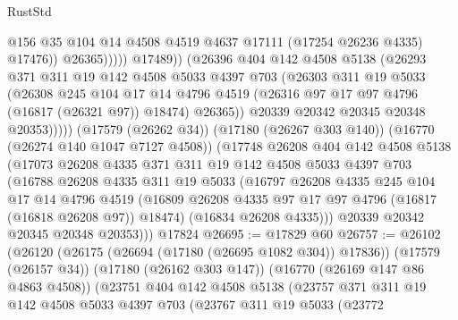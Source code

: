 \begin{lexlean}{RustStd}
\begin{coremodule}
{\begin{coremodule}
{{{{{{{{{{{{{{{{{{{{{{{{{{{{{{{{{{{{{{{{{{{{{{{{{{{{{{{                              @156
                              @35
                              @104
                              @14
                              @4508
                              @4519
                              @4637
                              @17111
                              (@17254 @26236 @4335)
                              @17476))
                          @26365)))))
                @17489))
            (@26396
              @404
              @142
              @4508
              @5138
              (@26293
                @371
                @311
                @19
                @142
                @4508
                @5033
                @4397
                @703
                (@26303
                  @311
                  @19
                  @5033
                  (@26308
                    @245
                    @104
                    @17
                    @14
                    @4796
                    @4519
                    (@26316 @97 @17 @97 @4796 (@16817 (@26321 @97)) @18474)
                    @26365))
                @20339
                @20342
                @20345
                @20348
                @20353)))))
      (@17579 (@26262 @34))
      (@17180 (@26267 @303 @140))
      (@16770 (@26274 @140 @1047 @7127 @4508))
      (@17748
        @26208
        @404
        @142
        @4508
        @5138
        (@17073
          @26208
          @4335
          @371
          @311
          @19
          @142
          @4508
          @5033
          @4397
          @703
          (@16788
            @26208
            @4335
            @311
            @19
            @5033
            (@16797
              @26208
              @4335
              @245
              @104
              @17
              @14
              @4796
              @4519
              (@16809 @26208 @4335 @97 @17 @97 @4796 (@16817 (@16818 @26208 @97)) @18474)
              (@16834 @26208 @4335)))
          @20339
          @20342
          @20345
          @20348
          @20353)))
    @17824
@26695 := @17829 @60
@26757 := @26102
    (@26120
      (@26175 (@26694 (@17180 (@26695 @1082 @304)) @17836))
      (@17579 (@26157 @34))
      (@17180 (@26162 @303 @147))
      (@16770 (@26169 @147 @86 @4863 @4508))
      (@23751
        @404
        @142
        @4508
        @5138
        (@23757
          @371
          @311
          @19
          @142
          @4508
          @5033
          @4397
          @703
          (@23767
            @311
            @19
            @5033
            (@23772
}}}}}}}}}}}}}}}}}}}}}}}}}}}}}}}}}}}}}}}}}}}}}}}}}}}}}}}
\end{coremodule}}
\end{coremodule}
\end{lexlean}
